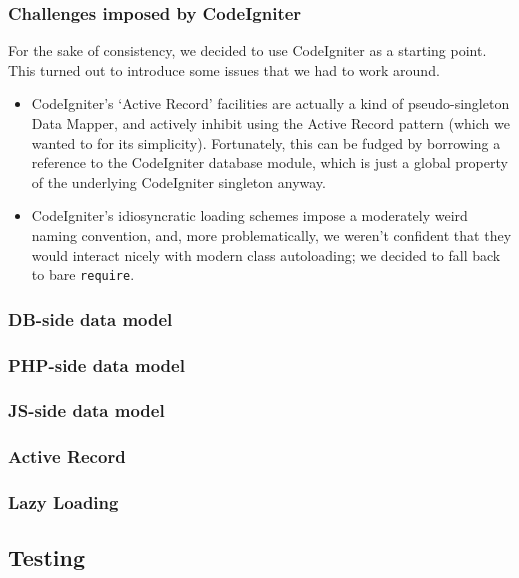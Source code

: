 \subsubsection{Challenges imposed by CodeIgniter}

For the sake of consistency, we decided to use CodeIgniter as a
starting point. This turned out to introduce some issues that we had
to work around.

\begin{itemize}
\item CodeIgniter's `Active Record' facilities are actually a kind of
  pseudo-singleton Data Mapper, and actively inhibit using the Active
  Record pattern (which we wanted to for its simplicity). Fortunately,
  this can be fudged by borrowing a reference to the CodeIgniter
  database module, which is just a global property of the underlying
  CodeIgniter singleton anyway.
\item CodeIgniter's idiosyncratic loading schemes impose a moderately
  weird naming convention, and, more problematically, we weren't
  confident that they would interact nicely with modern class
  autoloading; we decided to fall back to bare \texttt{require}.
\end{itemize}

\subsubsection{DB-side data model}

\subsubsection{PHP-side data model}

\subsubsection{JS-side data model}

\subsubsection{Active Record}

\subsubsection{Lazy Loading}

\subsection{Testing}

